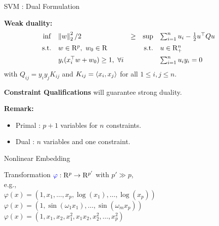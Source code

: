 \documentclass[9pt]{beamer}
\begin{document}
\begin{frame}{SVM : Dual Formulation}

  \textbf{Weak duality:}
  \[
    \begin{array}{rlcrl}
      \inf & \norm{w}_2^2/2 & \geq & \sup & \sum_{i=1}^n u_i - \frac12 u\tpose Q u \\[0.5em]
      \st & w\in\Re^p,~w_0\in\Re & & \st & u \in \Re^n_+ \\[0.5em] 
           & y_i(x_i\tpose w + w_0) \geq 1,~ \forall i & & & \sum_{i=1}^n u_i y_i = 0
    \end{array}
  \]
  with $Q_{ij}=y_iy_jK_{ij}$ and $K_{ij}=\iprod{x_i}{x_j}$ for all $1\leq i, j\leq n$.

  \vfill
  
  \textbf{Constraint Qualifications} will guarantee strong duality.

  \vfill
  \textbf{Remark:}
  \begin{itemize}
  \item<2-> Primal : $p+1$ variables for $n$ constraints.
  \item<2-> Dual : $n$ variables and one constraint.
  \end{itemize}

\end{frame}

\begin{frame}{Nonlinear Embedding}

  \begin{minipage}{0.4\textwidth}
    \begin{center}
      
    \end{center}
  \end{minipage}%
  \hfill
  \begin{minipage}{0.6\textwidth}
    Transformation $\emph{\varphi}:\Re^p\to\Re^{p'}$ with $p'\gg p$,\\ e.g.,\\
    $\varphi(x) = (1, x_1, \dots, x_p, \log(x_1), \dots, \log(x_p))$\\
    $\varphi(x) = (1,\sin(\omega_1 x_1), \dots, \sin(\omega_m x_p) )$\\
    $\varphi(x) = (1, x_1, x_2, x_1^2, x_1 x_2, x_2^2, \dots, x_p^2 )$\\[5em]
  \end{minipage}

  

  
\end{frame}
\end{document}
